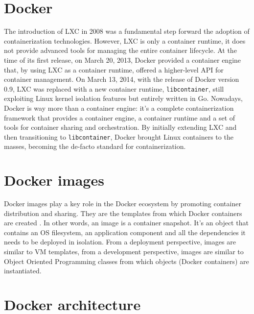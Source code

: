 \section{Docker}
The introduction of LXC in 2008 was a fundamental step forward the adoption of containerization technologies. However, LXC is only a container runtime, it does not provide advanced tools for managing the entire container lifecycle. \newline
At the time of its first release, on March 20, 2013,
Docker
provided a container engine that, by using LXC as a container runtime, offered a higher-level API for container management.
On March 13, 2014, with the release of Docker version 0.9, LXC was replaced with a new container runtime, \texttt{libcontainer}, still exploiting Linux kernel isolation features but entirely written in Go.
Nowadays, Docker is way more than a container engine: it's a complete containerization framework that provides a container engine, a container runtime and a set of tools for container sharing and orchestration.
By initially extending LXC and then transitioning to \texttt{libcontainer}, Docker brought Linux containers to the masses, becoming the de-facto standard for containerization. 

\section{Docker images}
Docker images play a key role in the Docker ecosystem by promoting container distribution and sharing.
They are the templates from which Docker containers are created \cite{WhatIsDocker}. 
In other words, an image is a container snapshot. It's an object that contains an OS filesystem, an application component and all the dependencies it needs to be deployed in isolation. 
From a deployment perspective, images are similar to VM templates, from a development perspective, images are similar to Object Oriented Programming classes from which objects (Docker containers) are instantiated.

\section{Docker architecture}

